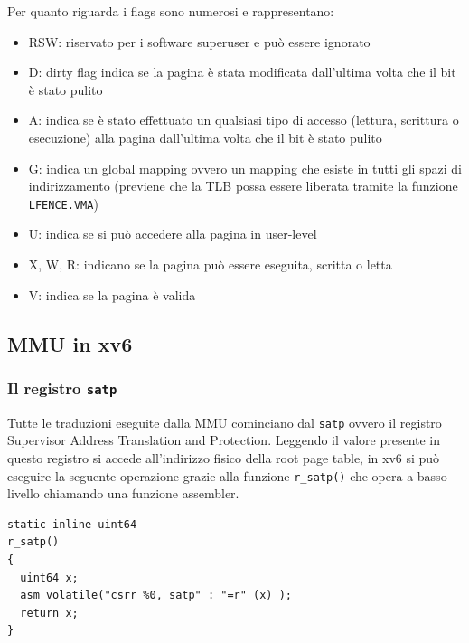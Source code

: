 Per quanto riguarda i flags sono numerosi e rappresentano:
\begin{itemize}
    \item RSW: riservato per i software superuser e può essere ignorato
    \item D: dirty flag indica se la pagina è stata modificata dall'ultima volta che il bit è stato pulito
    \item A: indica se è stato effettuato un qualsiasi tipo di accesso (lettura, scrittura o esecuzione) alla pagina dall'ultima volta che il bit è stato pulito 
    \item G: indica un global mapping ovvero un mapping che esiste in tutti gli spazi di indirizzamento (previene che la TLB possa essere liberata tramite la funzione \lstinline{LFENCE.VMA})
    \item U: indica se si può accedere alla pagina in user-level
    \item X, W, R: indicano se la pagina può essere eseguita, scritta o letta
    \item V: indica se la pagina è valida
\end{itemize}

\subsection{MMU in xv6}
\subsubsection{Il registro \lstinline{satp}}
Tutte le traduzioni eseguite dalla MMU cominciano dal \lstinline{satp} ovvero il registro Supervisor Address Translation and Protection. Leggendo il valore presente in questo registro si accede all'indirizzo fisico della root page table, in xv6 si può eseguire la seguente operazione grazie alla funzione \lstinline{r_satp()} che opera a basso livello chiamando una funzione assembler.
\begin{lstlisting}[caption=Funzione per leggere il valore del \lstinline{satp} presente in \lstinline{kernel/riscv.h}]
static inline uint64
r_satp()
{
  uint64 x;
  asm volatile("csrr %0, satp" : "=r" (x) );
  return x;
}
\end{lstlisting}


